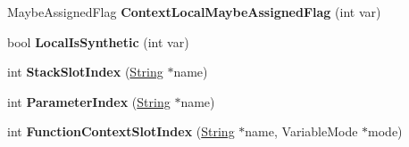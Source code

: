 \begin{DoxyCompactItemize}
\item 
\hypertarget{classv8_1_1internal_1_1_scope_info_af8735ce84326b15e7bbd1c783104aba6}{}Maybe\+Assigned\+Flag {\bfseries Context\+Local\+Maybe\+Assigned\+Flag} (int var)\label{classv8_1_1internal_1_1_scope_info_af8735ce84326b15e7bbd1c783104aba6}

\item 
\hypertarget{classv8_1_1internal_1_1_scope_info_a6a88807d2adcd8cc3b08b2f3d1d473bf}{}bool {\bfseries Local\+Is\+Synthetic} (int var)\label{classv8_1_1internal_1_1_scope_info_a6a88807d2adcd8cc3b08b2f3d1d473bf}

\item 
\hypertarget{classv8_1_1internal_1_1_scope_info_a9d747b94a71c42e5eac3a2420c4686c9}{}int {\bfseries Stack\+Slot\+Index} (\hyperlink{classv8_1_1internal_1_1_string}{String} $\ast$name)\label{classv8_1_1internal_1_1_scope_info_a9d747b94a71c42e5eac3a2420c4686c9}

\item 
\hypertarget{classv8_1_1internal_1_1_scope_info_a00f9938ad8b3975ffa57dbde5bccd7f3}{}int {\bfseries Parameter\+Index} (\hyperlink{classv8_1_1internal_1_1_string}{String} $\ast$name)\label{classv8_1_1internal_1_1_scope_info_a00f9938ad8b3975ffa57dbde5bccd7f3}

\item 
\hypertarget{classv8_1_1internal_1_1_scope_info_a6f12ab64462159f6fd4226cdd14d2279}{}int {\bfseries Function\+Context\+Slot\+Index} (\hyperlink{classv8_1_1internal_1_1_string}{String} $\ast$name, Variable\+Mode $\ast$mode)\label{classv8_1_1internal_1_1_scope_info_a6f12ab64462159f6fd4226cdd14d2279}

\end{DoxyCompactItemize}
